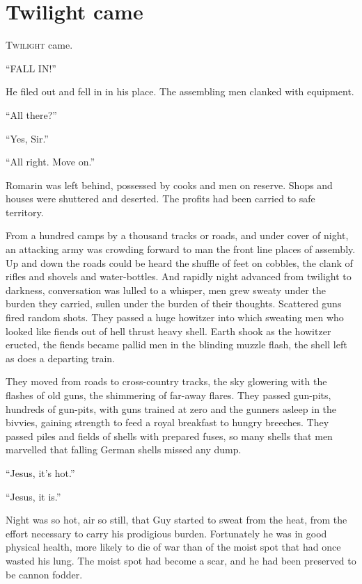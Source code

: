 \chapter*{\textsf{Twilight came}}

T\textsc{wilight} came.

``FALL IN!''

He filed out and fell in in his place. The assembling men clanked with equipment.

``All there?''

``Yes, Sir.''

``All right. Move on.''

Romarin was left behind, possessed by cooks and men on reserve. Shops and houses were shuttered and deserted. The profits had been carried to safe territory.

From a hundred camps by a thousand tracks or roads, and under cover of night, an attacking army was crowding forward to man the front line places of assembly. Up and down the roads could be heard the shuffle of feet on cobbles, the clank of rifles and shovels and water-bottles. And rapidly night advanced from twilight to darkness, conversation was lulled to a whisper, men grew sweaty under the burden they carried, sullen under the burden of their thoughts. Scattered guns fired random shots. They passed a huge howitzer into which sweating men who looked like fiends out of hell thrust heavy shell. Earth shook as the howitzer eructed, the fiends became pallid men in the blinding muzzle flash, the shell left as does a departing train.

They moved from roads to cross-country tracks, the sky glowering with the flashes of old guns, the shimmering of far-away flares. They passed gun-pits, hundreds of gun-pits, with guns trained at zero and the gunners asleep in the bivvies, gaining strength to feed a royal breakfast to hungry breeches. They passed piles and fields of shells with prepared fuses, so many shells that men marvelled that falling German shells missed any dump.

``Jesus, it's hot.''

``Jesus, it is.''

Night was so hot, air so still, that Guy started to sweat from the heat, from the effort necessary to carry his prodigious burden. Fortunately he was in good physical health, more likely to die of war than of the moist spot that had once wasted his lung. The moist spot had become a scar, and he had been preserved to be cannon fodder.


